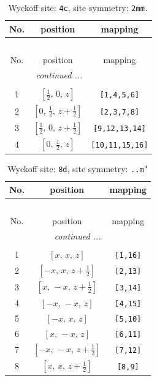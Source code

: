 \documentclass[fleqn,8pt]{jsarticle}
\begin{document}
\renewcommand{\arraystretch}{1.2}
\begin{longtable}{ccc}
\caption{Wyckoff site: {\tt 4c}, site symmetry: {\tt 2mm.}}
 \\
 \hline \hline
No. & position & mapping \\ \hline \endfirsthead

\multicolumn{2}{l}{\tablename\ \thetable{}} \\
 \hline \hline
No. & position & mapping \\ \hline \endhead

 \hline \hline
\multicolumn{2}{r}{\footnotesize\it continued ...} \\ \endfoot

 \hline \hline
\multicolumn{2}{r}{} \\ \endlastfoot

1 & $\left[ \frac{1}{2},\, 0,\, z \right]$ & {\tt [1,4,5,6]} \\ \hline
2 & $\left[ 0,\, \frac{1}{2},\, z + \frac{1}{2} \right]$ & {\tt [2,3,7,8]} \\ \hline
3 & $\left[ \frac{1}{2},\, 0,\, z + \frac{1}{2} \right]$ & {\tt [9,12,13,14]} \\ \hline
4 & $\left[ 0,\, \frac{1}{2},\, z \right]$ & {\tt [10,11,15,16]} \\
\end{longtable}
\renewcommand{\arraystretch}{1.2}
\begin{longtable}{ccc}
\caption{Wyckoff site: {\tt 8d}, site symmetry: {\tt ..m'}}
 \\
 \hline \hline
No. & position & mapping \\ \hline \endfirsthead

\multicolumn{2}{l}{\tablename\ \thetable{}} \\
 \hline \hline
No. & position & mapping \\ \hline \endhead

 \hline \hline
\multicolumn{2}{r}{\footnotesize\it continued ...} \\ \endfoot

 \hline \hline
\multicolumn{2}{r}{} \\ \endlastfoot

1 & $\left[ x,\, x,\, z \right]$ & {\tt [1,16]} \\ \hline
2 & $\left[ - x,\, x,\, z + \frac{1}{2} \right]$ & {\tt [2,13]} \\ \hline
3 & $\left[ x,\, - x,\, z + \frac{1}{2} \right]$ & {\tt [3,14]} \\ \hline
4 & $\left[ - x,\, - x,\, z \right]$ & {\tt [4,15]} \\ \hline
5 & $\left[ - x,\, x,\, z \right]$ & {\tt [5,10]} \\ \hline
6 & $\left[ x,\, - x,\, z \right]$ & {\tt [6,11]} \\ \hline
7 & $\left[ - x,\, - x,\, z + \frac{1}{2} \right]$ & {\tt [7,12]} \\ \hline
8 & $\left[ x,\, x,\, z + \frac{1}{2} \right]$ & {\tt [8,9]} \\
\end{longtable}
\end{document}
